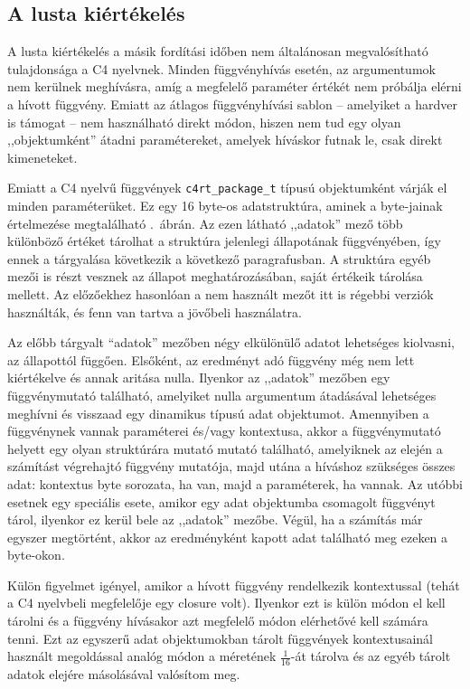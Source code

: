 \subsection{A lusta kiértékelés}\label{sec:c4:rt:pkg}

A lusta kiértékelés a másik fordítási időben nem általánosan megvalósítható tulajdonsága a C4 nyelvnek.
Minden függvényhívás esetén, az argumentumok nem kerülnek meghívásra, amíg a megfelelő paraméter értékét nem próbálja elérni a hívott függvény.
Emiatt az átlagos függvényhívási sablon -- amelyiket a hardver is támogat -- nem használható direkt módon, hiszen nem tud egy olyan ,,objektumként'' átadni paramétereket, amelyek híváskor futnak le, csak direkt kimeneteket.

Emiatt a C4 nyelvű függvények {\tt c4rt\_package\_t} típusú objektumként várják el minden paraméterüket.
Ez egy 16 byte-os adatstruktúra, aminek a byte-jainak értelmezése megtalálható .~ábrán.
Az ezen látható ,,adatok'' mező több különböző értéket tárolhat a struktúra jelenlegi állapotának függvényében, így ennek a tárgyalása következik a következő paragrafusban.
A struktúra egyéb mezői is részt vesznek az állapot meghatározásában, saját értékeik tárolása mellett.
Az előzőekhez hasonlóan a nem használt mezőt itt is régebbi verziók használták, és fenn van tartva a jövőbeli használatra.

Az előbb tárgyalt ``adatok'' mezőben négy elkülönülő adatot lehetséges kiolvasni, az állapottól függően.
Elsőként, az eredményt adó függvény még nem lett kiértékelve és annak aritása nulla.
Ilyenkor az ,,adatok'' mezőben egy függvénymutató található, amelyiket nulla argumentum átadásával lehetséges meghívni és visszaad egy dinamikus típusú adat objektumot.
Amennyiben a függvénynek vannak paraméterei és/vagy kontextusa, akkor a függvénymutató helyett egy olyan struktúrára mutató mutató található, amelyiknek az elején a számítást végrehajtó függvény mutatója, majd utána a híváshoz szükséges összes adat: kontextus byte sorozata, ha van, majd a paraméterek, ha vannak.
Az utóbbi esetnek egy speciális esete, amikor egy adat objektumba csomagolt függvényt tárol, ilyenkor ez kerül bele az ,,adatok'' mezőbe.
Végül, ha a számítás már egyszer megtörtént, akkor az eredményként kapott adat található meg ezeken a byte-okon.

Külön figyelmet igényel, amikor a hívott függvény rendelkezik kontextussal (tehát a C4 nyelvbeli megfelelője egy closure volt).
Ilyenkor ezt is külön módon el kell tárolni és a függvény hívásakor azt megfelelő módon elérhetővé kell számára tenni.
Ezt az egyszerű adat objektumokban tárolt függvények kontextusainál használt megoldással analóg módon a méretének $\frac{1}{16}$-át tárolva és az egyéb tárolt adatok elejére másolásával valósítom meg.
